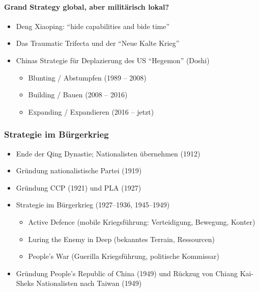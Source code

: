 {}\documentclass[a4paper]{article}
\providecommand{\tightlist}{\setlength{\itemsep}{1mm}\setlength{\parskip}{1mm}}
\begin{document}
\paragraph{Grand Strategy global, aber militärisch
	lokal?}\label{grand-strategy-global-aber-milituxe4risch-lokal}

\begin{itemize}
	\tightlist
	\item
	      Deng Xiaoping: ``hide capabilities and bide time''
	\item
	      Das Traumatic Trifecta und der ``Neue Kalte Krieg''
	\item
	      Chinas Strategie für Deplazierung des US ``Hegemon'' (Doshi)

	      \begin{itemize}
		      \tightlist
		      \item
		            Blunting / Abstumpfen (1989 -- 2008)
		      \item
		            Building / Bauen (2008 -- 2016)
		      \item
		            Expanding / Expandieren (2016 -- jetzt)
	      \end{itemize}
\end{itemize}

\subsubsection{Strategie im
	Bürgerkrieg}\label{strategie-im-buxfcrgerkrieg}

\begin{itemize}
	\tightlist
	\item
	      Ende der Qing Dynastie; Nationalisten übernehmen (1912)
	\item
	      Gründung nationalistische Partei (1919)
	\item
	      Gründung CCP (1921) und PLA (1927)
	\item
	      Strategie im Bürgerkrieg (1927--1936, 1945--1949)

	      \begin{itemize}
		      \tightlist
		      \item
		            Active Defence (mobile Kriegsführung: Verteidigung, Bewegung,
		            Konter)
		      \item
		            Luring the Enemy in Deep (bekanntes Terrain, Ressourcen)
		      \item
		            People's War (Guerilla Kriegsführung, politische Kommissar)
	      \end{itemize}
	\item
	      Gründung People's Republic of China (1949) und Rückzug von Chiang
	      Kai-Sheks Nationalisten nach Taiwan (1949)
\end{itemize}
\end{document}
